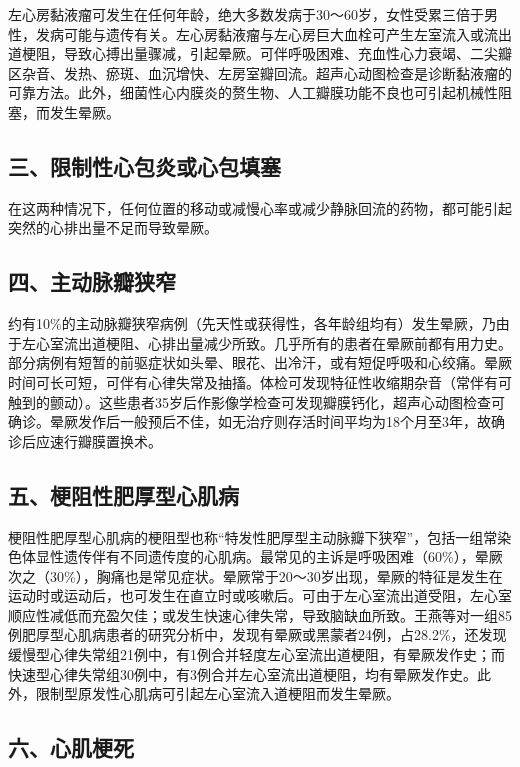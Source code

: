 左心房黏液瘤可发生在任何年龄，绝大多数发病于30～60岁，女性受累三倍于男性，发病可能与遗传有关。左心房黏液瘤与左心房巨大血栓可产生左室流入或流出道梗阻，导致心搏出量骤减，引起晕厥。可伴呼吸困难、充血性心力衰竭、二尖瓣区杂音、发热、瘀斑、血沉增快、左房室瓣回流。超声心动图检查是诊断黏液瘤的可靠方法。此外，细菌性心内膜炎的赘生物、人工瓣膜功能不良也可引起机械性阻塞，而发生晕厥。

\subsection{三、限制性心包炎或心包填塞}

在这两种情况下，任何位置的移动或减慢心率或减少静脉回流的药物，都可能引起突然的心排出量不足而导致晕厥。

\subsection{四、主动脉瓣狭窄}

约有10\%的主动脉瓣狭窄病例（先天性或获得性，各年龄组均有）发生晕厥，乃由于左心室流出道梗阻、心排出量减少所致。几乎所有的患者在晕厥前都有用力史。部分病例有短暂的前驱症状如头晕、眼花、出冷汗，或有短促呼吸和心绞痛。晕厥时间可长可短，可伴有心律失常及抽搐。体检可发现特征性收缩期杂音（常伴有可触到的颤动）。这些患者35岁后作影像学检查可发现瓣膜钙化，超声心动图检查可确诊。晕厥发作后一般预后不佳，如无治疗则存活时间平均为18个月至3年，故确诊后应速行瓣膜置换术。

\subsection{五、梗阻性肥厚型心肌病}

梗阻性肥厚型心肌病的梗阻型也称“特发性肥厚型主动脉瓣下狭窄”，包括一组常染色体显性遗传伴有不同遗传度的心肌病。最常见的主诉是呼吸困难（60\%），晕厥次之（30\%），胸痛也是常见症状。晕厥常于20～30岁出现，晕厥的特征是发生在运动时或运动后，也可发生在直立时或咳嗽后。可由于左心室流出道受阻，左心室顺应性减低而充盈欠佳；或发生快速心律失常，导致脑缺血所致。王燕等对一组85例肥厚型心肌病患者的研究分析中，发现有晕厥或黑蒙者24例，占28.2\%，还发现缓慢型心律失常组21例中，有1例合并轻度左心室流出道梗阻，有晕厥发作史；而快速型心律失常组30例中，有3例合并左心室流出道梗阻，均有晕厥发作史。此外，限制型原发性心肌病可引起左心室流入道梗阻而发生晕厥。

\subsection{六、心肌梗死}

